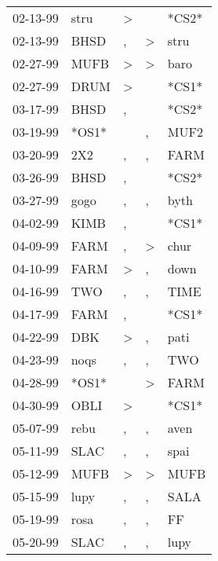 \begin{supertabular}{lllll}
 02-13-99 &   stru &     \textgreater &                  &  *CS2* \\
 02-13-99 &   BHSD &                , &     \textgreater &   stru \\
 02-27-99 &   MUFB &     \textgreater &     \textgreater &   baro \\
 02-27-99 &   DRUM &     \textgreater &                  &  *CS1* \\
 03-17-99 &   BHSD &                , &                  &  *CS2* \\
 03-19-99 &  *OS1* &                  &                , &   MUF2 \\
 03-20-99 &    2X2 &                , &                , &   FARM \\
 03-26-99 &   BHSD &                , &                  &  *CS2* \\
 03-27-99 &   gogo &                , &                , &   byth \\
 04-02-99 &   KIMB &                , &                  &  *CS1* \\
 04-09-99 &   FARM &                , &     \textgreater &   chur \\
 04-10-99 &   FARM &     \textgreater &                , &   down \\
 04-16-99 &    TWO &                , &                , &   TIME \\
 04-17-99 &   FARM &                , &                  &  *CS1* \\
 04-22-99 &    DBK &     \textgreater &                , &   pati \\
 04-23-99 &   noqs &                , &                , &    TWO \\
 04-28-99 &  *OS1* &                  &     \textgreater &   FARM \\
 04-30-99 &   OBLI &     \textgreater &                  &  *CS1* \\
 05-07-99 &   rebu &                , &                , &   aven \\
 05-11-99 &   SLAC &                , &                , &   spai \\
 05-12-99 &   MUFB &     \textgreater &     \textgreater &   MUFB \\
 05-15-99 &   lupy &                , &                , &   SALA \\
 05-19-99 &   rosa &                , &                , &     FF \\
 05-20-99 &   SLAC &                , &                , &   lupy \\

\end{supertabular}
